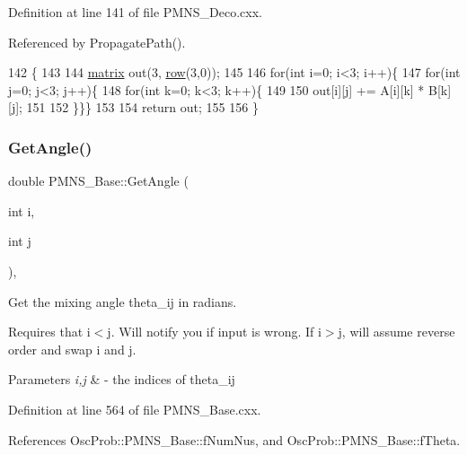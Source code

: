Definition at line 141 of file P\+M\+N\+S\+\_\+\+Deco.\+cxx.



Referenced by Propagate\+Path().


\begin{DoxyCode}
142 \{
143 
144   \hyperlink{classOscProb_1_1PMNS__Deco_a77b4e0c041b6268910a270be0f5387c9}{matrix} out(3, \hyperlink{classOscProb_1_1PMNS__Deco_a34634741bc68bc1c524cf47f44e7f5b6}{row}(3,0));
145   
146   \textcolor{keywordflow}{for}(\textcolor{keywordtype}{int} i=0; i<3; i++)\{
147   \textcolor{keywordflow}{for}(\textcolor{keywordtype}{int} j=0; j<3; j++)\{
148   \textcolor{keywordflow}{for}(\textcolor{keywordtype}{int} k=0; k<3; k++)\{
149 
150     out[i][j] += A[i][k] * B[k][j];
151 
152   \}\}\}
153   
154   \textcolor{keywordflow}{return} out;
155 
156 \}
\end{DoxyCode}
\mbox{\label{classOscProb_1_1PMNS__Base_acee137091304c919642293ddf015bbc8}} 
\subsubsection{\texorpdfstring{Get\+Angle()}{GetAngle()}}
{\footnotesize\ttfamily double P\+M\+N\+S\+\_\+\+Base\+::\+Get\+Angle (\begin{DoxyParamCaption}\item[{int}]{i,  }\item[{int}]{j }\end{DoxyParamCaption})\hspace{0.3cm}{\ttfamily [virtual]}, {\ttfamily [inherited]}}

Get the mixing angle theta\+\_\+ij in radians.

Requires that i$<$j. Will notify you if input is wrong. If i$>$j, will assume reverse order and swap i and j.


\begin{DoxyParams}{Parameters}
{\em i,j} & -\/ the indices of theta\+\_\+ij \\
\hline
\end{DoxyParams}


Definition at line 564 of file P\+M\+N\+S\+\_\+\+Base.\+cxx.



References Osc\+Prob\+::\+P\+M\+N\+S\+\_\+\+Base\+::f\+Num\+Nus, and Osc\+Prob\+::\+P\+M\+N\+S\+\_\+\+Base\+::f\+Theta.


